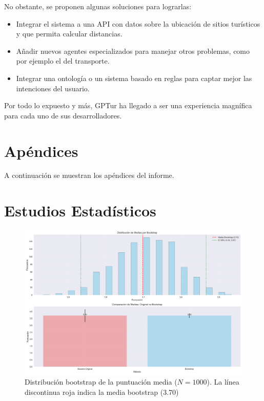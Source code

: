 \documentclass[10pt]{llncs}
\begin{document}
No obstante, se proponen algunas soluciones para lograrlas:
\begin{itemize}
    \item Integrar el sistema a una API con datos sobre la ubicación de sitios turísticos y que permita calcular distancias.
    \item Añadir nuevos agentes especializados para manejar otros problemas, como por ejemplo el del transporte.
    \item Integrar una ontología o un sistema basado en reglas para captar mejor las intenciones del usuario.
\end{itemize}

Por todo lo expuesto y más, GPTur ha llegado a ser una experiencia magnífica para cada uno de sus desarrolladores.

\newpage
\section{Apéndices}
A continuación se muestran los apéndices del informe.
\appendix

\section{Estudios Estadísticos}

\begin{figure}
\centering
\includegraphics[width=1\textwidth]{../src/experiments/one_only_agent/bootstrap_distribution_20250617-171514.png}
\caption{Distribución bootstrap de la puntuación media ($N=1000$). La línea discontinua roja indica la media bootstrap (3.70)}
\label{fig:boot_dist_1}
\end{figure}
\end{document}
